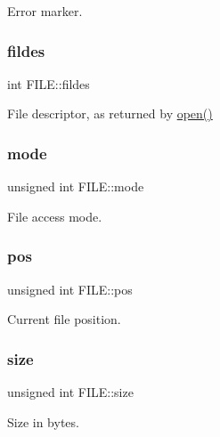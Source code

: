 Error marker. 

\mbox{\label{structFILE_a03eb666eb26d69532cabfd9041848875}} 
\subsubsection{\texorpdfstring{fildes}{fildes}}
{\footnotesize\ttfamily int F\+I\+L\+E\+::fildes}



File descriptor, as returned by \hyperlink{fcntl_8h_a3ad75e4ab5b8343998fbdb4b40c0973b}{open()} 

\mbox{\label{structFILE_ae65fa42375bf2dd80303a67a562d7783}} 
\subsubsection{\texorpdfstring{mode}{mode}}
{\footnotesize\ttfamily unsigned int F\+I\+L\+E\+::mode}



File access mode. 

\mbox{\label{structFILE_aad42c1377afb068e9c0f015961657a3c}} 
\subsubsection{\texorpdfstring{pos}{pos}}
{\footnotesize\ttfamily unsigned int F\+I\+L\+E\+::pos}



Current file position. 

\mbox{\label{structFILE_a52a41fff17507a76ddf9cd7e1dc41379}} 
\subsubsection{\texorpdfstring{size}{size}}
{\footnotesize\ttfamily unsigned int F\+I\+L\+E\+::size}



Size in bytes. 

\mbox{\label{structFILE_a4fe302cf95bc53156809770fd1cc4278}} 
